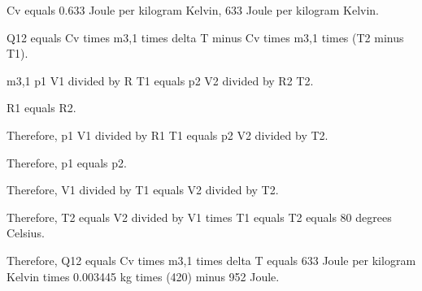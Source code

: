 Cv equals 0.633 Joule per kilogram Kelvin, 633 Joule per kilogram Kelvin.

Q12 equals Cv times m3,1 times delta T minus Cv times m3,1 times (T2 minus T1).

m3,1 p1 V1 divided by R T1 equals p2 V2 divided by R2 T2.

R1 equals R2.

Therefore, p1 V1 divided by R1 T1 equals p2 V2 divided by T2.

Therefore, p1 equals p2.

Therefore, V1 divided by T1 equals V2 divided by T2.

Therefore, T2 equals V2 divided by V1 times T1 equals T2 equals 80 degrees Celsius.

Therefore, Q12 equals Cv times m3,1 times delta T equals 633 Joule per kilogram Kelvin times 0.003445 kg times (420) minus 952 Joule.